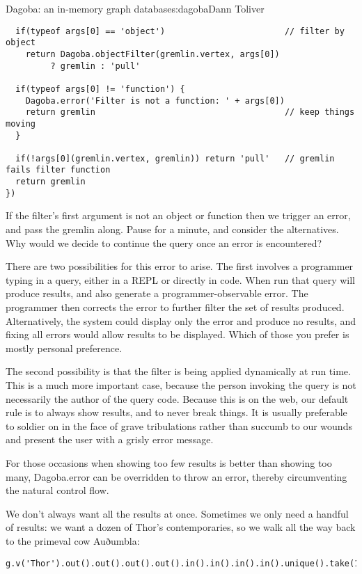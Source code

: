 \begin{aosachapter}{Dagoba: an in-memory graph database}{s:dagoba}{Dann Toliver}
\begin{verbatim}
  if(typeof args[0] == 'object')                        // filter by object
    return Dagoba.objectFilter(gremlin.vertex, args[0]) 
         ? gremlin : 'pull'

  if(typeof args[0] != 'function') {
    Dagoba.error('Filter is not a function: ' + args[0]) 
    return gremlin                                      // keep things moving
  }

  if(!args[0](gremlin.vertex, gremlin)) return 'pull'   // gremlin fails filter function 
  return gremlin
})
\end{verbatim}

If the filter's first argument is not an object or function then we
trigger an error, and pass the gremlin along. Pause for a minute, and
consider the alternatives. Why would we decide to continue the query
once an error is encountered?

There are two possibilities for this error to arise. The first involves
a programmer typing in a query, either in a REPL or directly in code.
When run that query will produce results, and also generate a
programmer-observable error. The programmer then corrects the error to
further filter the set of results produced. Alternatively, the system
could display only the error and produce no results, and fixing all
errors would allow results to be displayed. Which of those you prefer is
mostly personal preference.

The second possibility is that the filter is being applied dynamically
at run time. This is a much more important case, because the person
invoking the query is not necessarily the author of the query code.
Because this is on the web, our default rule is to always show results,
and to never break things. It is usually preferable to soldier on in the
face of grave tribulations rather than succumb to our wounds and present
the user with a grisly error message.

For those occasions when showing too few results is better than showing
too many, Dagoba.error can be overridden to throw an error, thereby
circumventing the natural control flow.

\label{take}

We don't always want all the results at once. Sometimes we only need a
handful of results: we want a dozen of Thor's contemporaries, so we walk
all the way back to the primeval cow Auðumbla:

\begin{verbatim}
g.v('Thor').out().out().out().out().in().in().in().in().unique().take(12).run()
\end{verbatim}


\end{aosachapter}
